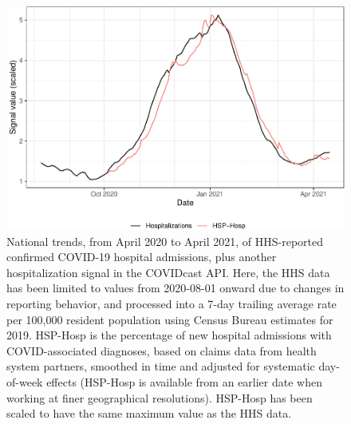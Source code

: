 \begin{figure}

{\centering \includegraphics[width=\textwidth]{fig/hospitalization_time_trends_national-1}

}

\caption{National trends, from April 2020 to April 2021, of HHS-reported confirmed COVID-19 hospital admissions, plus another hospitalization signal in the COVIDcast API. Here, the HHS data has been limited to values from 2020-08-01 onward due to changes in reporting behavior, and processed into a 7-day trailing average rate per 100,000 resident population using Census Bureau estimates for 2019. HSP-Hosp is the percentage of new hospital admissions with COVID-associated diagnoses, based on claims data from health system partners, smoothed in time and adjusted for systematic day-of-week effects (HSP-Hosp is available from an earlier date when working at finer geographical resolutions). HSP-Hosp has been scaled to have the same maximum value as the HHS data.}\label{fig:hospitalization_time_trends_national}
\end{figure}

\clearpage

